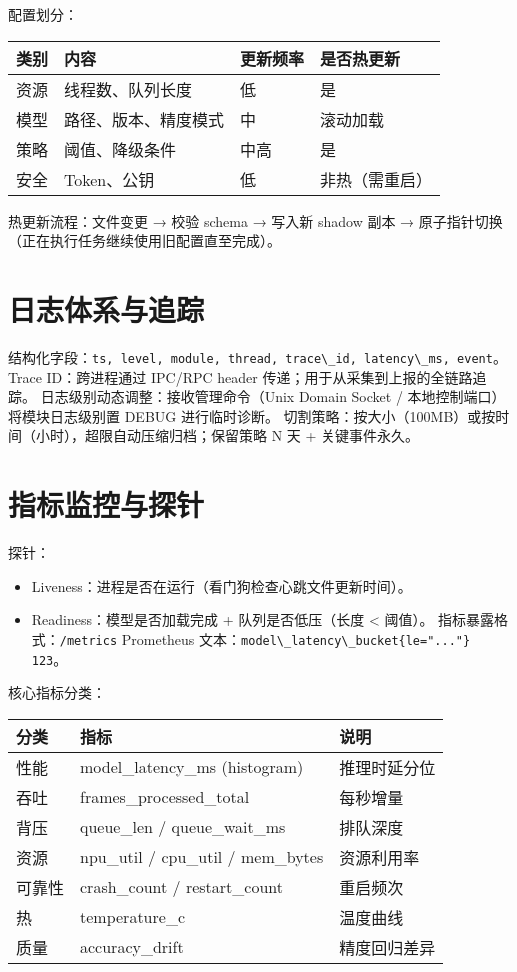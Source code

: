配置划分：

\begin{longtable}[]{@{}llll@{}}
\toprule\noalign{}
类别 & 内容 & 更新频率 & 是否热更新 \\
\midrule\noalign{}
\endhead
\bottomrule\noalign{}
\endlastfoot
资源 & 线程数、队列长度 & 低 & 是 \\
模型 & 路径、版本、精度模式 & 中 & 滚动加载 \\
策略 & 阈值、降级条件 & 中高 & 是 \\
安全 & Token、公钥 & 低 & 非热（需重启） \\
\end{longtable}

热更新流程：文件变更 → 校验 schema → 写入新 shadow 副本 →
原子指针切换（正在执行任务继续使用旧配置直至完成）。

\section{日志体系与追踪}\label{ux65e5ux5fd7ux4f53ux7cfbux4e0eux8ffdux8e2a}

结构化字段：\passthrough{\lstinline!ts, level, module, thread, trace\_id, latency\_ms, event!}。
Trace ID：跨进程通过 IPC/RPC header 传递；用于从采集到上报的全链路追踪。
日志级别动态调整：接收管理命令（Unix Domain Socket /
本地控制端口）将模块日志级别置 DEBUG 进行临时诊断。
切割策略：按大小（100MB）或按时间（小时），超限自动压缩归档；保留策略 N
天 + 关键事件永久。

\section{指标监控与探针}\label{ux6307ux6807ux76d1ux63a7ux4e0eux63a2ux9488}

探针：

\begin{itemize}
\tightlist
\item
  Liveness：进程是否在运行（看门狗检查心跳文件更新时间）。
\item
  Readiness：模型是否加载完成 + 队列是否低压（长度 \textless{} 阈值）。
  指标暴露格式：\passthrough{\lstinline!/metrics!} Prometheus
  文本：\passthrough{\lstinline!model\_latency\_bucket\{le="..."\} 123!}。
\end{itemize}

核心指标分类：

\begin{longtable}[]{@{}lll@{}}
\toprule\noalign{}
分类 & 指标 & 说明 \\
\midrule\noalign{}
\endhead
\bottomrule\noalign{}
\endlastfoot
性能 & model\_latency\_ms (histogram) & 推理时延分位 \\
吞吐 & frames\_processed\_total & 每秒增量 \\
背压 & queue\_len / queue\_wait\_ms & 排队深度 \\
资源 & npu\_util / cpu\_util / mem\_bytes & 资源利用率 \\
可靠性 & crash\_count / restart\_count & 重启频次 \\
热 & temperature\_c & 温度曲线 \\
质量 & accuracy\_drift & 精度回归差异 \\
\end{longtable}

